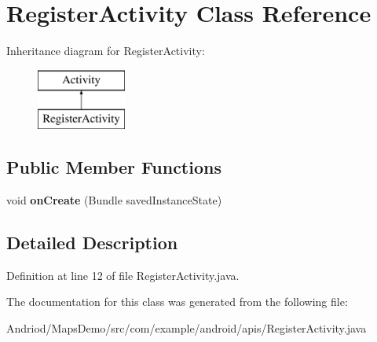 \hypertarget{classcom_1_1example_1_1android_1_1apis_1_1_register_activity}{\section{Register\-Activity Class Reference}
\label{classcom_1_1example_1_1android_1_1apis_1_1_register_activity}
}
Inheritance diagram for Register\-Activity\-:\begin{figure}[H]
\begin{center}
\leavevmode
\includegraphics[height=2.000000cm]{classcom_1_1example_1_1android_1_1apis_1_1_register_activity}
\end{center}
\end{figure}
\subsection*{Public Member Functions}
\begin{DoxyCompactItemize}
\item 
\hypertarget{classcom_1_1example_1_1android_1_1apis_1_1_register_activity_a85e87cb5ced88dff7c8173ecc4f636d1}{void {\bfseries on\-Create} (Bundle saved\-Instance\-State)}\label{classcom_1_1example_1_1android_1_1apis_1_1_register_activity_a85e87cb5ced88dff7c8173ecc4f636d1}

\end{DoxyCompactItemize}


\subsection{Detailed Description}


Definition at line 12 of file Register\-Activity.\-java.



The documentation for this class was generated from the following file\-:\begin{DoxyCompactItemize}
\item 
Andriod/\-Maps\-Demo/src/com/example/android/apis/Register\-Activity.\-java\end{DoxyCompactItemize}
